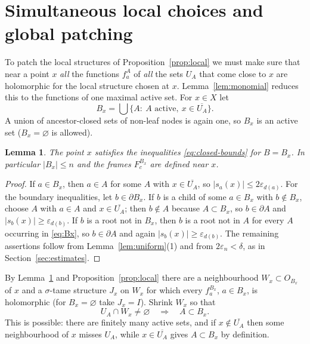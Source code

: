 \documentclass[11pt]{article}
\newtheorem{lemma}[theorem]{Lemma}
\theoremstyle{remark}
\newcommand{\eps}{\varepsilon}
\begin{document}
\section{Simultaneous local choices and global patching}\label{sec:patching}

To patch the local structures of Proposition~\ref{prop:local} we must
make sure that near a point $x$ \emph{all} the functions $f^A_a$ of
\emph{all} the sets $U_A$ that come close to $x$ are holomorphic for
the local structure chosen at $x$. Lemma~\ref{lem:monomial} reduces
this to the functions of one maximal active set. For $x\in X$ let
\begin{equation}\label{eq:Bx}
 B_x=\bigcup\{A:\ A\text{ active},\ x\in\overline{U_A}\}.
\end{equation}
A union of ancestor-closed sets of non-leaf nodes is again one, so
$B_x$ is an active set ($B_x=\varnothing$ is allowed).

\begin{lemma}\label{lem:Bx}
The point $x$ satisfies the inequalities \eqref{eq:closed-bounds} for
$B=B_x$. In particular $|B_x|\le n$ and the frames $F^{B_x}_c$ are
defined near $x$.
\end{lemma}

\begin{proof}
If $a\in B_x$, then $a\in A$ for some $A$ with $x\in\overline{U_A}$,
so $|s_a(x)|\le2\eps_{d(a)}$. For the boundary inequalities, let
$b\in\partial B_x$. If $b$ is a child of some $a\in B_x$ with
$b\notin B_x$, choose $A$ with $a\in A$ and $x\in\overline{U_A}$; then
$b\notin A$ because $A\subset B_x$, so $b\in\partial A$ and
$|s_b(x)|\ge\eps_{d(b)}$. If $b$ is a root not in $B_x$, then $b$ is a
root not in $A$ for every $A$ occurring in \eqref{eq:Bx}, so
$b\in\partial A$ and again $|s_b(x)|\ge\eps_{d(b)}$. The remaining
assertions follow from Lemma~\ref{lem:uniform}(1) and from
$2\eps_n<\delta$, as in Section~\ref{sec:estimates}.
\end{proof}

By Lemma~\ref{lem:Bx} and Proposition~\ref{prop:local} there are a
neighbourhood $W_x\subset O_{B_x}$ of $x$ and a $\sigma$-tame structure
$J_x$ on $W_x$ for which every $f^{B_x}_a$, $a\in B_x$, is holomorphic
(for $B_x=\varnothing$ take $J_x=I$). Shrink $W_x$ so that
\begin{equation}\label{eq:shrink}
 U_A\cap W_x\ne\varnothing\quad\Longrightarrow\quad A\subset B_x .
\end{equation}
This is possible: there are finitely many active sets, and if
$x\notin\overline{U_A}$ then some neighbourhood of $x$ misses $U_A$,
while $x\in\overline{U_A}$ gives $A\subset B_x$ by definition.
\end{document}
